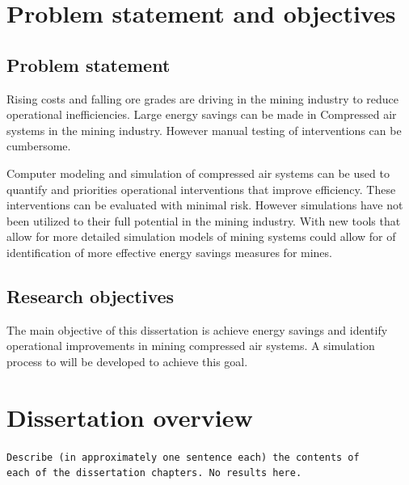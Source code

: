 	\section{Problem statement and objectives}
	\subsection{Problem statement}
 		Rising costs and falling ore grades are driving in the mining industry to reduce operational inefficiencies. Large energy savings can be made in Compressed air systems in the mining industry. However manual testing of interventions can be cumbersome.
 		\par
 		Computer modeling and simulation of compressed air systems can be used to quantify and priorities operational interventions that improve efficiency. These interventions can be evaluated with minimal risk. However simulations have not been utilized to their full potential in the mining industry. With new tools that allow for more detailed simulation models of mining systems could allow for of identification of more effective energy savings measures for mines.
	\subsection{Research objectives}
		The main objective of this dissertation is achieve energy savings and identify operational improvements in mining compressed air systems. A simulation process to will be developed to achieve this goal.
\section{Dissertation overview}
	\texttt{Describe (in approximately one sentence each) the contents of \\each of the dissertation chapters. No results here.}